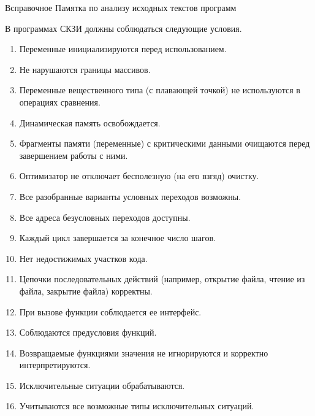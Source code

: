 \begin{appendix}{В}{справочное}
{Памятка по анализу исходных текстов программ}
\label{REVIEW} 

\mbox{}

В программах СКЗИ должны соблюдаться следующие условия.

\begin{enumerate}
\item 
Переменные инициализируются перед использованием.

\item 
Не нарушаются границы массивов.

\item 
Переменные вещественного типа (с плавающей точкой) не используются в операциях
сравнения.

\item 
Динамическая память освобождается.

\item 
Фрагменты памяти (переменные) с критическими данными очищаются перед 
завершением работы с ними. 

\item
Оптимизатор не отключает бесполезную (на его взгяд) очистку.

\item 
Все разобранные варианты условных переходов возможны.

\item 
Все адреса безусловных переходов доступны.

\item 
Каждый цикл завершается за конечное число шагов.

\item 
Нет недостижимых участков кода.

\item 
Цепочки последовательных действий (например, открытие файла, 
чтение из файла, закрытие файла) корректны. 

\item 
При вызове функции соблюдается ее интерфейс.

\item 
Соблюдаются предусловия функций.

\item 
Возвращаемые функциями значения не игнорируются и корректно интерпретируются.

\item 
Исключительные ситуации обрабатываются. 

\item 
Учитываются все возможные типы исключительных ситуаций. 


\end{enumerate}
\end{appendix}
